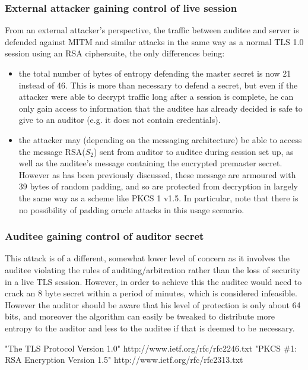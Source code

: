 \documentclass[10pt,a4paper]{article}
\begin{document}
\subsubsection{External attacker gaining control of live session}

\noindent From an external attacker's perspective, the traffic between auditee and server is defended against MITM and similar attacks in the same way as a normal TLS 1.0 session using an RSA ciphersuite, the only differences being: 
\begin{itemize}
\item the total number of bytes of entropy defending the master secret is now 21 instead of 46. This is more than necessary to defend a secret, but even if the attacker were able to decrypt traffic long after a session is complete, he can only gain access to information that the auditee has already decided is safe to give to an auditor (e.g. it does not contain credentials).
\item the attacker may (depending on the messaging architecture) be able to access the message RSA($S_2$) sent from auditor to auditee during session set up, as well as the auditee's message containing the encrypted premaster secret. However as has been previously discussed, these message are armoured with 39 bytes of random padding, and so are protected from decryption in largely the same way as a scheme like PKCS 1 v1.5. In particular, note that there is no possibility of padding oracle attacks in this usage scenario. 
\end{itemize}

\subsubsection{Auditee gaining control of auditor secret}
This attack is of a different, somewhat lower level of concern as it involves the auditee violating the rules of auditing/arbitration rather than the loss of security in a live TLS session. However, in order to achieve this the auditee would need to crack an 8 byte secret within a period of minutes, which is considered infeasible. However the auditor should be aware that his level of protection is only about 64 bits, and moreover the algorithm can easily be tweaked to distribute more entropy to the auditor and less to the auditee if that is deemed to be necessary.

\pagebreak

 \begin{thebibliography}{1}

   "The TLS Protocol Version 1.0" http://www.ietf.org/rfc/rfc2246.txt
   "PKCS \#1: RSA Encryption Version 1.5" \newline http://www.ietf.org/rfc/rfc2313.txt

  \end{thebibliography}
  
\end{document}
